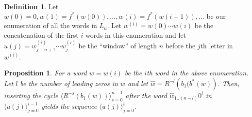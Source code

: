 \documentclass{article}
\newtheorem{proposition}[theorem]{Proposition}
\theoremstyle{definition}
\newtheorem{definition}{Definition}
\newcommand{\T}[1]{\langle{#1}\rangle}
\newcommand{\rl}[2]{R^{-{#2}}({#1})}
\begin{document}
\begin{definition}
	Let $w(0)=0, w(1)=f^*(w(0)),\dots,w(i)=f^*(w{(i-1)}),\dots$ be our enumeration of all the words in $L_n$. Let $w^{(i)}=w(0)\cdots w(i)$ be the concatenation of the first $i$ words in this enumeration and let $u(j)=w^{(i)}_{j-n+1}\cdots w^{(i)}_j$ be the ``window'' of length $n$ before the $j$th letter in $w^{(i)}$.
\end{definition}

\begin{proposition}
	For a word $w=w(i)$ be the $i$th word in the above enumeration. Let $l$ be the number of leading zeros in $w$ and let $\hat{w}=\rl{b_1(b^*(w)}{l}$. Then, inserting the cycle $\T{\rl{b_1(w)}{s}}_{s=0}^{n-1}$ after the word $\hat{w}_{1..(n-l)}0^l$ in $\T{u(j)}_{j=0}^{i-1}$ yields the sequence $\T{u(j)}_{j=0}^{i}$.
\end{proposition}		
	
		
\end{document}
